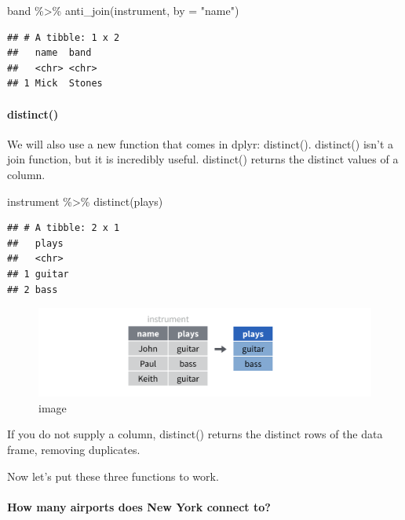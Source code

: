 \documentclass[
]{article}
\newenvironment{Shaded}{\begin{snugshade}}{\end{snugshade}}
\newcommand{\AttributeTok}[1]{\textcolor[rgb]{0.77,0.63,0.00}{#1}}
\newcommand{\FunctionTok}[1]{\textcolor[rgb]{0.00,0.00,0.00}{#1}}
\newcommand{\NormalTok}[1]{#1}
\newcommand{\SpecialCharTok}[1]{\textcolor[rgb]{0.00,0.00,0.00}{#1}}
\newcommand{\StringTok}[1]{\textcolor[rgb]{0.31,0.60,0.02}{#1}}
\begin{document}
\begin{Shaded}
\begin{Highlighting}[]
\NormalTok{band }\SpecialCharTok{\%\textgreater{}\%} \FunctionTok{anti\_join}\NormalTok{(instrument, }\AttributeTok{by =} \StringTok{"name"}\NormalTok{)}
\end{Highlighting}
\end{Shaded}

\begin{verbatim}
## # A tibble: 1 x 2
##   name  band  
##   <chr> <chr> 
## 1 Mick  Stones
\end{verbatim}

\hypertarget{distinct}{%
\paragraph{distinct()}\label{distinct}}

We will also use a new function that comes in dplyr: distinct().
distinct() isn't a join function, but it is incredibly useful.
distinct() returns the distinct values of a column.

\begin{Shaded}
\begin{Highlighting}[]
\NormalTok{instrument }\SpecialCharTok{\%\textgreater{}\%} \FunctionTok{distinct}\NormalTok{(plays)}
\end{Highlighting}
\end{Shaded}

\begin{verbatim}
## # A tibble: 2 x 1
##   plays 
##   <chr> 
## 1 guitar
## 2 bass
\end{verbatim}

\begin{figure}
\centering
\includegraphics{data/distinct.png}
\caption{image}
\end{figure}

If you do not supply a column, distinct() returns the distinct rows of
the data frame, removing duplicates.

Now let's put these three functions to work.

\hypertarget{how-many-airports-does-new-york-connect-to}{%
\paragraph{How many airports does New York connect
to?}\label{how-many-airports-does-new-york-connect-to}}
\end{document}

